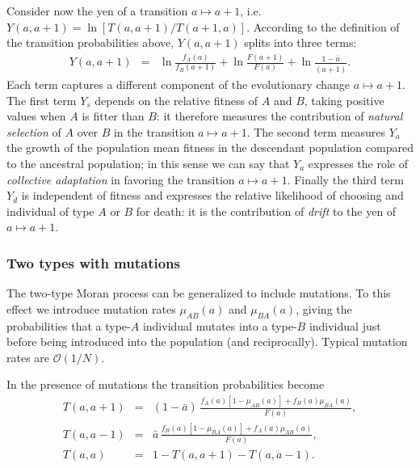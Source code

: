 \documentclass[aps,prd,11pt,notitlepage,nofootinbib,superscriptaddress,showkeys,letterpaper]{revtex4-1}
\begin{document}
Consider now the yen of a transition $a\mapsto a+1$, i.e. $Y(a,a+1)=\ln [T(a,a+1)/T(a+1,a)]$. According to the definition of the transition probabilities above, $Y(a,a+1)$ splits into three terms:
\begin{eqnarray}
        Y(a,a+1)&=&\ln \frac{f_A(a)}{f_B(a+1)}+\ln \frac{F(a+1)}{F(a)}+\ln \frac{1-\overline{a}}{\overline{(a+1)}}.%
\end{eqnarray}
Each term captures a different component of the evolutionary change $a\mapsto a+1$. The first term $Y_s$ depends on the relative fitness of $A$ and $B$, taking positive values when $A$ is fitter than $B$: it therefore measures the contribution of \textit{natural selection} of $A$ over $B$ in the transition $a\mapsto a+1$. The second term measures $Y_a$ the growth of the population mean fitness in the descendant population compared to the ancestral population; in this sense we can say that $Y_a$ expresses the role of \textit{collective adaptation} in favoring the transition $a\mapsto a+1$. Finally the third term $Y_d$ is independent of fitness and expresses the relative likelihood of choosing and individual of type $A$ or $B$ for death: it is the contribution of \textit{drift} to the yen of $a\mapsto a+1$. 

\subsubsection{Two types with mutations}

The two-type Moran process can be generalized to include mutations. To this effect we introduce mutation rates $\mu_{AB}(a)$ and $\mu_{BA}(a)$, giving the probabilities that a type-$A$ individual mutates into a type-$B$ individual just before being introduced into the population (and reciprocally). Typical mutation rates are $\mathcal{O}(1/N)$. %

In the presence of mutations the transition probabilities become
\begin{eqnarray}
        T(a,a+1)&=&(1-\bar{a})\, \frac{f_A(a)[1-\mu_{AB}(a)]+f_B(a)\mu_{BA}(a)}{F(a)},\\
        T(a,a-1)&=&\bar{a}\,\frac{f_B(a)[1-\mu_{BA}(a)]+f_A(a)\mu_{AB}(a)}{F(a)},\\
        T(a,a)&=&1-T(a,a+1)-T(a,a-1).
\end{eqnarray} 
\end{document}
